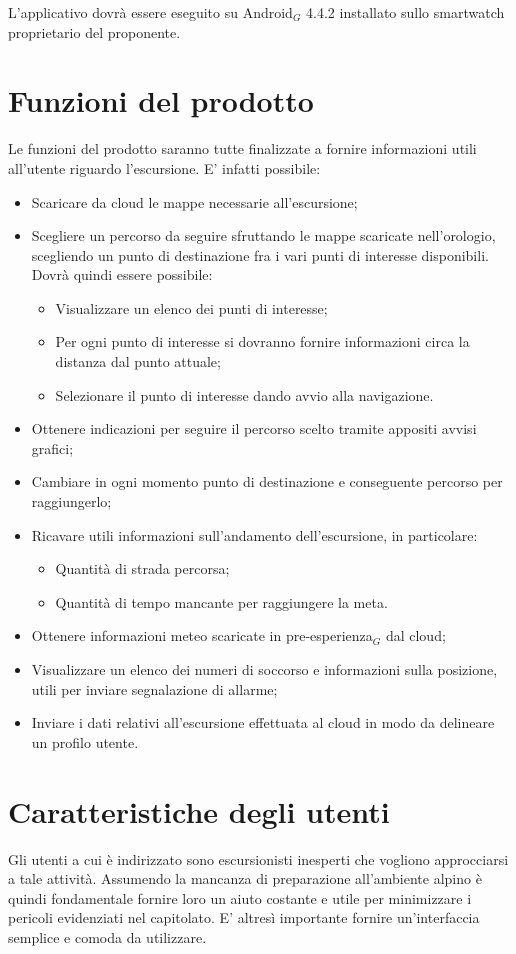 L'applicativo dovrà essere eseguito su Android$_{G}$ 4.4.2 installato sullo smartwatch proprietario del proponente. 

\section{Funzioni del prodotto}
Le funzioni del prodotto saranno tutte finalizzate a fornire informazioni utili all'utente riguardo l'escursione. E' infatti possibile:
\begin{itemize}
\item Scaricare da cloud le mappe necessarie all'escursione;
\item Scegliere un percorso da seguire sfruttando le mappe scaricate nell'orologio, scegliendo un punto di destinazione fra i vari punti di interesse disponibili. \\Dovrà quindi essere possibile:
\begin{itemize}
\item Visualizzare un elenco dei punti di interesse;
\item Per ogni punto di interesse si dovranno fornire informazioni circa la distanza dal punto attuale;
\item Selezionare il punto di interesse dando avvio alla navigazione.
\end{itemize}
\item Ottenere indicazioni per seguire il percorso scelto tramite appositi avvisi grafici;
\item Cambiare in ogni momento punto di destinazione e conseguente percorso per raggiungerlo;
\item Ricavare utili informazioni sull'andamento dell'escursione, in particolare:
\begin{itemize}
\item Quantità di strada percorsa;
\item Quantità di tempo mancante per raggiungere la meta.
\end{itemize}
\item Ottenere informazioni meteo scaricate in pre-esperienza$_{G}$ dal cloud;
\item Visualizzare un elenco dei numeri di soccorso e informazioni sulla posizione, utili per inviare segnalazione di allarme;
\item Inviare i dati relativi all'escursione effettuata al cloud in modo da delineare un profilo utente.
\end{itemize}

\section{Caratteristiche degli utenti}
Gli utenti a cui è indirizzato \CAPITOLATO{} sono escursionisti inesperti che vogliono approcciarsi a tale attività. Assumendo la mancanza di preparazione all'ambiente alpino è quindi fondamentale fornire loro un aiuto costante e utile per minimizzare i pericoli evidenziati nel capitolato. E' altresì importante fornire un'interfaccia semplice e comoda da utilizzare.

